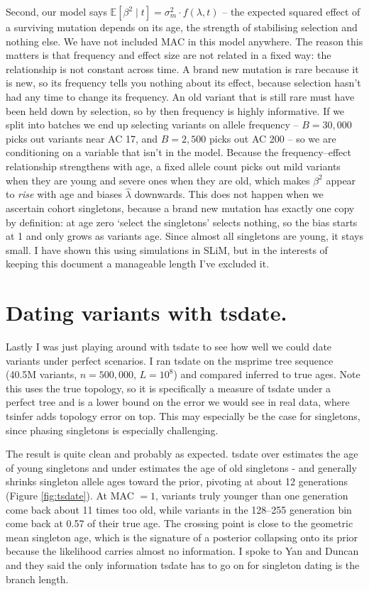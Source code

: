 \documentclass{article}
\begin{document}
Second, our model says $\mathbb{E}[\beta^2 \mid t] = \sigma_m^2 \cdot f(\lambda, t)$ -- the expected squared effect of a surviving mutation depends on its age, the strength of stabilising selection and nothing else. We have not included MAC in this model anywhere. The reason this matters is that frequency and effect size are not related in a fixed way: the relationship is not constant across time. A brand new mutation is rare because it is new, so its frequency tells you nothing about its effect, because selection hasn't had any time to change its frequency. An old variant that is still rare must have been held down by selection, so by then frequency is highly informative. If we split into batches we end up selecting variants on allele frequency -- $B = 30{,}000$ picks out variants near AC 17, and $B = 2{,}500$ picks out AC 200 -- so we are conditioning on a variable that isn't in the model. Because the frequency--effect relationship strengthens with age, a fixed allele count picks out mild variants when they are young and severe ones when they are old, which makes $\beta^2$ appear to \emph{rise} with age and biases $\hat\lambda$ downwards. This does not happen when we ascertain cohort singletons, because a brand new mutation has exactly one copy by definition: at age zero `select the singletons' selects nothing, so the bias starts at 1 and only grows as variants age. Since almost all singletons are young, it stays small. I have shown this using simulations in SLiM, but in the interests of keeping this document a manageable length I've excluded it.

\section{Dating variants with tsdate.}

Lastly I was just playing around with tsdate to see how well we could date variants under perfect scenarios. I ran tsdate on the msprime tree sequence (40.5M variants, $n = 500{,}000$, $L = 10^8$) and compared inferred to true ages. Note this uses the true topology, so it is specifically a measure of tsdate under a perfect tree and is a lower bound on the error we would see in real data, where tsinfer adds topology error on top. This may especially be the case for singletons, since phasing singletons is especially challenging.

The result is quite clean and probably as expected. tsdate over estimates the age of young singletons and under estimates the age of old singletons - and generally shrinks singleton allele ages toward the prior, pivoting at about 12 generations (Figure \ref{fig:tsdate}). At MAC $=1$, variants truly younger than one generation come back about 11 times too old, while variants in the 128--255 generation bin come back at 0.57 of their true age. The crossing point is close to the geometric mean singleton age, which is the signature of a posterior collapsing onto its prior because the likelihood carries almost no information. I spoke to Yan and Duncan and they said the only information tsdate has to go on for singleton dating is the branch length.
\end{document}
